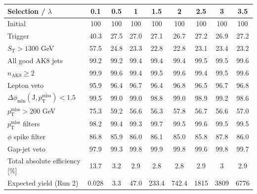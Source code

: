 {\footnotesize\setlength{\tabcolsep}{1.45pt}\renewcommand{\arraystretch}{0.82}%
\begin{tabular}{@{}lcccccccc@{}}
\hline
Selection / $\lambda$ & 0.1 & 0.5 & 1 & 1.5 & 2 & 2.5 & 3 & 3.5 \\
\hline
Initial & 100 & 100 & 100 & 100 & 100 & 100 & 100 & 100 \\
Trigger & 40.3 & 27.5 & 27.0 & 27.1 & 26.7 & 27.2 & 26.9 & 27.2 \\
$S_{\mathrm{T}}>1300$ GeV & 57.5 & 24.8 & 23.3 & 22.8 & 22.8 & 23.1 & 23.4 & 23.2 \\
All good AK8 jets & 99.2 & 99.2 & 99.4 & 99.4 & 99.4 & 99.5 & 99.5 & 99.6 \\
$n_{\mathrm{AK8}}\geq 2$ & 99.9 & 99.6 & 99.4 & 99.5 & 99.6 & 99.4 & 99.5 & 99.6 \\
Lepton veto & 95.9 & 96.4 & 96.7 & 96.4 & 96.8 & 96.5 & 96.7 & 96.8 \\
$\Delta\phi_{\min}(\mathrm{J},p_{\mathrm{T}}^{\mathrm{miss}})<1.5$ & 99.5 & 99.0 & 99.0 & 98.8 & 99.0 & 98.9 & 99.2 & 98.6 \\
$p_{\mathrm{T}}^{\mathrm{miss}}>200$ GeV & 75.3 & 59.2 & 56.6 & 56.3 & 57.8 & 56.7 & 56.6 & 57.0 \\
$p_{\mathrm{T}}^{\mathrm{miss}}$ filters & 98.2 & 99.4 & 99.3 & 99.7 & 99.5 & 99.6 & 99.5 & 99.5 \\
$\phi$ spike filter & 86.8 & 85.9 & 86.0 & 86.1 & 85.0 & 85.8 & 87.8 & 86.0 \\
Gap-jet veto & 97.9 & 99.3 & 99.8 & 99.9 & 99.8 & 99.6 & 99.8 & 99.7 \\
\hline
Total absolute efficiency [\%] & 13.7 & 3.2 & 2.9 & 2.8 & 2.8 & 2.9 & 3 & 2.9 \\
\hline
Expected yield (Run 2) & 0.028 & 3.3 & 47.0 & 233.4 & 742.4 & 1815 & 3809 & 6776 \\
\hline
\end{tabular}%
}
